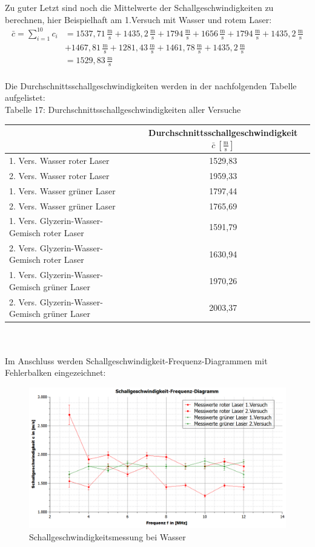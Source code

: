 \documentclass[fontsize=12pt]{scrartcl}
\begin{document}
\newpage
\noindent
Zu guter Letzt sind noch die Mittelwerte der Schallgeschwindigkeiten zu berechnen, hier Beispielhaft am 1.Versuch mit Wasser und rotem Laser:
\begin{align*}
\bar{c}=\sum_{i=1}^{10} c_i& = 1537,71 \,\frac{{\text{m}}}{{\text{s}}}+ 1435,2 \,\frac{{\text{m}}}{{\text{s}}}+ 1794 \,\frac{{\text{m}}}{{\text{s}}}+ 1656 \,\frac{{\text{m}}}{{\text{s}}}+ 1794\,\frac{{\text{m}}}{{\text{s}}} + 1435,2\,\frac{{\text{m}}}{{\text{s}}}\\ 
&+ 1467,81\,\frac{{\text{m}}}{{\text{s}}} + 1281,43\,\frac{{\text{m}}}{{\text{s}}}  + 1461,78\,\frac{{\text{m}}}{{\text{s}}} + 1435,2\,\frac{{\text{m}}}{{\text{s}}} \\
&= 1529,83\,\frac{{\text{m}}}{{\text{s}}}
\end{align*}
~\\
Die Durchschnittsschallgeschwindigkeiten werden in der nachfolgenden Tabelle aufgelistet:\\
Tabelle 17: Durchschnittsschallgeschwindigkeiten aller Versuche \\
\begin{tabular}{|l|c|} \hline
 & Durchschnittsschallgeschwindigkeit $ \bar{c}~[\frac{{\text{m}}}{{\text{s}}}]$ \\ \hline
  1. Vers. Wasser roter Laser & 1529,83 \\ \hline
  2. Vers. Wasser roter Laser & 1959,33 \\ \hline
  1. Vers. Wasser grüner Laser & 1797,44  \\ \hline
  2. Vers. Wasser grüner Laser & 1765,69 \\ \hline
  1. Vers. Glyzerin-Wasser-Gemisch roter Laser &  1591,79 \\ \hline
  2. Vers. Glyzerin-Wasser-Gemisch roter Laser &1630,94 \\ \hline
  1. Vers. Glyzerin-Wasser-Gemisch grüner Laser & 1970,26 \\ \hline
  2. Vers. Glyzerin-Wasser-Gemisch grüner Laser & 2003,37 \\ \hline
\end{tabular}\\
~\\
\newpage
\noindent
Im Anschluss werden Schallgeschwindigkeit-Frequenz-Diagrammen mit Fehlerbalken eingezeichnet:
\begin{figure}[h]
\includegraphics[scale=0.4]{Graphik/SchallgeschwindigkeitWasserFehlerbalken}
\caption{Schallgeschwindigkeitsmessung bei Wasser}
\end{figure}
\end{document}
